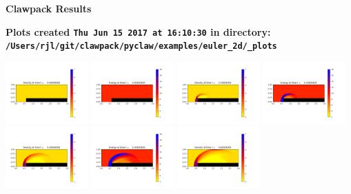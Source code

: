 \documentclass[11pt]{article}
\begin{document}
        \begin{center}{\Large\bf Clawpack Results}\vskip 5pt
        
        \bf Plots created {\tt Thu Jun 15 2017 at 16:10:30} in directory: \vskip 5pt
        \verb+/Users/rjl/git/clawpack/pyclaw/examples/euler_2d/_plots+
        \end{center}
        \vskip 5pt
        \includegraphics[width=0.2375\textwidth]{frame0000fig0.png}
\includegraphics[width=0.2375\textwidth]{frame0000fig2.png}
\includegraphics[width=0.2375\textwidth]{frame0001fig0.png}
\includegraphics[width=0.2375\textwidth]{frame0001fig2.png}
\vskip 10pt 
\includegraphics[width=0.2375\textwidth]{frame0002fig0.png}
\includegraphics[width=0.2375\textwidth]{frame0002fig2.png}
\includegraphics[width=0.2375\textwidth]{frame0003fig0.png}
\end{document}
